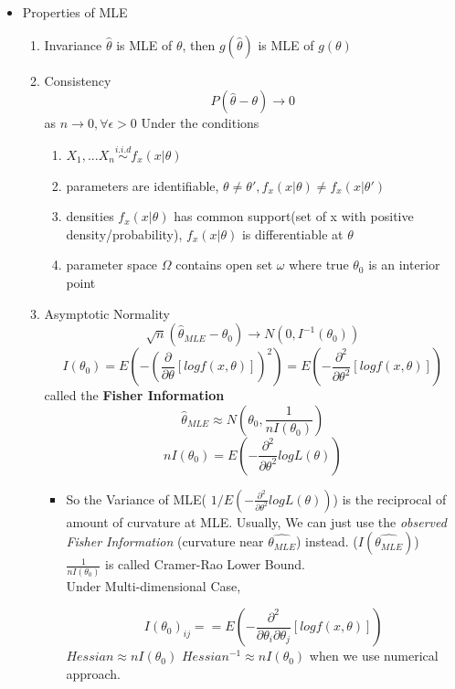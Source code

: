 \documentclass[11pt, openany]{book}              %
\begin{document}
\begin{itemize}
    \item Properties of MLE
    	\begin{enumerate}
    		\item Invariance $\hat{\theta}$ is MLE of $\theta$, then $g(\hat{\theta})$ is MLE of $g(\theta)$
    		\item Consistency $$P(\hat{\theta} - \theta ) \rightarrow 0$$ as $n \rightarrow 0, \forall \epsilon > 0$ Under the conditions
    		\begin{enumerate}
    			\item $X_1,...X_n \stackrel{i.i.d}{\sim} f_x(x|\theta)$
    			\item parameters are identifiable, $\theta \neq \theta', f_x(x|\theta) \neq f_x(x|\theta')$
    			\item densities $f_x(x|\theta)$ has common support(set of x with positive density/probability), $f_x(x|\theta)$ is differentiable at $\theta$
    			\item parameter space $\Omega$ contains open set $\omega$ where true $\theta_0$ is an interior point
    		\end{enumerate}
    		\item Asymptotic Normality 
    		$$ \sqrt{n}(\hat{\theta}_{MLE} - \theta_0) \rightarrow N(0, I^{-1}(\theta_0)) $$
    		$$ I(\theta_0) = E( -(\frac{\partial}{\partial \theta} [log f(x, \theta ) ])^2)=E(-\frac{\partial^2}{\partial \theta^2} [log f(x, \theta ) ] )$$ 
    		called the \textbf{Fisher Information}
    		$$ \hat{\theta}_{MLE} \approx N(\theta_0, \frac{1}{n I(\theta_0)})$$
    		$$ n I(\theta_0) = E( -\frac{\partial^2}{\partial \theta^2} log L(\theta) )$$
    		\begin{itemize}
    		\item	So the Variance of MLE( $1/ E( -\frac{\partial^2}{\partial \theta^2} log L(\theta) )$) is the reciprocal of amount of curvature at MLE. 
    			Usually, We can just use the \textit{observed Fisher Information} (curvature near $\hat{\theta_{MLE}}$) instead. ($I(\hat{\theta_{MLE}})$) \\
    		$\frac{1}{ n I(\theta_0)}$ is called Cramer-Rao Lower Bound. \\ Under Multi-dimensional Case, 
    		
    			$$ I(\theta_0)_{ij} = =E(-\frac{\partial^2}{\partial \theta_i \partial \theta_j} [log f(x, \theta ) ] )$$ $Hessian \approx nI(\theta_0)$ $Hessian^{-1} \approx nI(\theta_0)$ when we use numerical approach. 


\end{itemize}
\end{enumerate}
\end{itemize}
\end{document}

